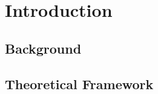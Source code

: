 
\chapter{Introduction}
\label{cha:intro}

\section{Background}
\label{sec:basis}

\section{Theoretical Framework}
\label{sec:framework}

